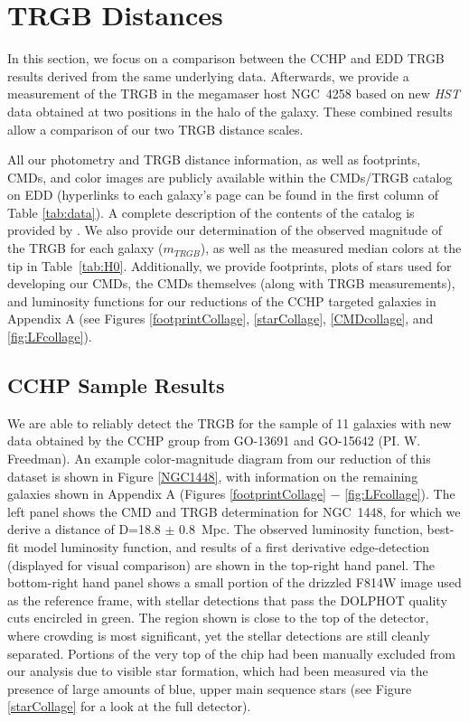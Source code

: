 \documentclass[twocolumn]{aastex62}
\begin{document}
\section{TRGB Distances}

In this section, we focus on a comparison between the CCHP and EDD TRGB results derived from the same underlying data. Afterwards, we provide a measurement of the TRGB in the megamaser host NGC~4258 based on new \textit{HST} data obtained at two positions in the halo of the galaxy. These combined results allow a comparison of our two TRGB distance scales.


All our photometry and TRGB distance information, as well as footprints, CMDs, and color images are publicly available within the CMDs/TRGB catalog on EDD (hyperlinks to each galaxy's page can be found in the first column of Table \ref{tab:data}). A complete description of the contents of the catalog is provided by \cite{2021arXiv210402649A}. We also provide our determination of the observed magnitude of the TRGB for each galaxy ($m_{TRGB}$), as well as the measured median colors at the tip in Table~\ref{tab:H0}. Additionally, we provide footprints, plots of stars used for developing our CMDs, the CMDs themselves (along with TRGB measurements), and luminosity functions for our reductions of the CCHP targeted galaxies in Appendix A (see Figures \ref{footprintCollage}, \ref{starCollage}, \ref{CMDcollage}, and \ref{fig:LFcollage}).


\subsection{CCHP Sample Results}

We are able to reliably detect the TRGB for the sample of 11 galaxies with new data obtained by the CCHP group from GO-13691 and GO-15642 (PI. W. Freedman). An example color-magnitude diagram from our reduction of this dataset is shown in Figure \ref{NGC1448}, with information on the remaining galaxies shown in Appendix A (Figures \ref{footprintCollage} $-$ \ref{fig:LFcollage}). The left panel shows the CMD and TRGB determination for NGC~1448, for which we derive a distance of D=18.8 $\pm$ 0.8~Mpc. The observed luminosity function, best-fit model luminosity function, and results of a first derivative edge-detection (displayed for visual comparison) are shown in the top-right hand panel. The bottom-right hand panel shows a small portion of the drizzled F814W image used as the reference frame, with stellar detections that pass the DOLPHOT quality cuts encircled in green. The region shown is close to the top of the detector, where crowding is most significant, yet the stellar detections are still cleanly separated. Portions of the very top of the chip had been manually excluded from our analysis due to visible star formation, which had been measured via the presence of large amounts of blue, upper main sequence stars (see Figure \ref{starCollage} for a look at the full detector). 
\end{document}
